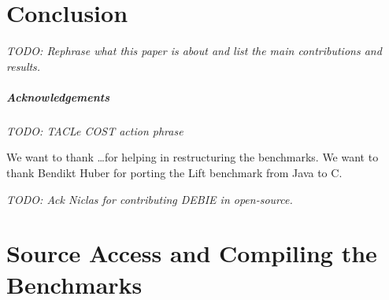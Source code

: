 \documentclass[a4paper,UKenglish]{oasics}
\newcommand{\todo}[1]{{\emph{TODO: #1}}}
\begin{document}
\section{Conclusion}
\label{sec:conclusion}

\todo{Rephrase what this paper is about and list the main contributions and results.}

\subparagraph*{Acknowledgements}

\todo{TACLe COST action phrase}

We want to thank \dots for helping in restructuring the benchmarks.
We want to thank Bendikt Huber for porting the Lift benchmark from Java to C.

\todo{Ack Niclas for contributing DEBIE in open-source.}

\appendix
\section{Source Access and Compiling the Benchmarks}



\end{document}
